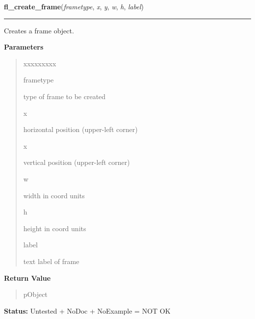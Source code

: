     \label{xformslib:library:fl_create_frame}

    \vspace{0.5ex}

\hspace{.8\funcindent}\begin{boxedminipage}{\funcwidth}

    \raggedright \textbf{fl\_create\_frame}(\textit{frametype}, \textit{x}, \textit{y}, \textit{w}, \textit{h}, \textit{label})

    \vspace{-1.5ex}

    \rule{\textwidth}{0.5\fboxrule}
\setlength{\parskip}{2ex}
    Creates a frame object.

\setlength{\parskip}{1ex}
      \textbf{Parameters}
      \vspace{-1ex}

      \begin{quote}
        \begin{Ventry}{xxxxxxxxx}

          \item[frametype]

          type of frame to be created

          \item[x]

          horizontal position (upper-left corner)

          \item[x]

          vertical position (upper-left corner)

          \item[w]

          width in coord units

          \item[h]

          height in coord units

          \item[label]

          text label of frame

        \end{Ventry}

      \end{quote}

      \textbf{Return Value}
    \vspace{-1ex}

      \begin{quote}
      pObject

      \end{quote}

\textbf{Status:} Untested + NoDoc + NoExample = NOT OK



    \end{boxedminipage}


